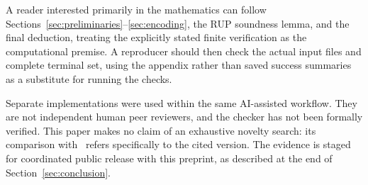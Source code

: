 A reader interested primarily in the mathematics can follow
Sections~\ref{sec:preliminaries}--\ref{sec:encoding}, the RUP soundness
lemma, and the final deduction, treating the explicitly stated finite
verification as the computational premise. A reproducer should then
check the actual input files and complete terminal set, using the
appendix rather than saved success summaries as a substitute for running
the checks.

Separate implementations were used within the same AI-assisted workflow.
They are not independent human peer reviewers, and the checker has not
been formally verified. This paper makes no claim of an exhaustive
novelty search: its comparison with~\cite{proper} refers specifically to
the cited version. The evidence is staged for coordinated public release with this
preprint, as described at the end of Section~\ref{sec:conclusion}.

